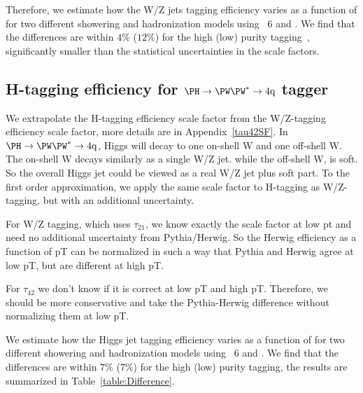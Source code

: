 Therefore, we estimate how the W/Z jets tagging efficiency varies 
as a function of
\pt for two different showering and hadronization models using
\PYTHIA~6 and \HERWIG{++}.
We find that the differences are within $4\%$ ($12\%$)
for the high (low) purity tagging~\cite{CMS:2013fea}, 
significantly smaller than the statistical uncertainties in the scale factors.


\subsection{H-tagging efficiency for $\Hww$ tagger}

We extrapolate the H-tagging efficiency scale factor 
from the W/Z-tagging efficiency scale factor, more details are 
in Appendix~\ref{tau42SF}.
In $\Hww$, Higgs will decay to one on-shell W and one off-shell W. The 
on-shell W decays similarly as a single W/Z jet.
 while the off-shell W, is soft. 
So the overall Higgs
jet could be viewed as a real W/Z jet plus soft part.    
To the first order approximation, 
we apply the same scale factor to H-tagging as W/Z-tagging, but 
with an additional uncertainty.


For W/Z tagging, which uses $\tau_{21}$, we know exactly 
the scale factor at low pt and need no additional uncertainty 
from Pythia/Herwig. So the Herwig efficiency as a function
 of pT can be normalized in such a way
 that Pythia and Herwig agree at low pT, 
but are different at high pT.

For $\tau_{42}$ we don't know if it is correct at low pT and
high pT. Therefore, we should be more conservative 
and take the Pythia-Herwig difference
 without normalizing them at low pT. 

We estimate how the Higgs jet tagging efficiency varies
as a function of
\pt for two different showering and hadronization models using
\PYTHIA~6 and \HERWIG{++}.
We find that the differences are within $7\%$ ($7\%$)
for the high (low) purity tagging, the results are summarized in
Table~\ref{table:Difference}.

